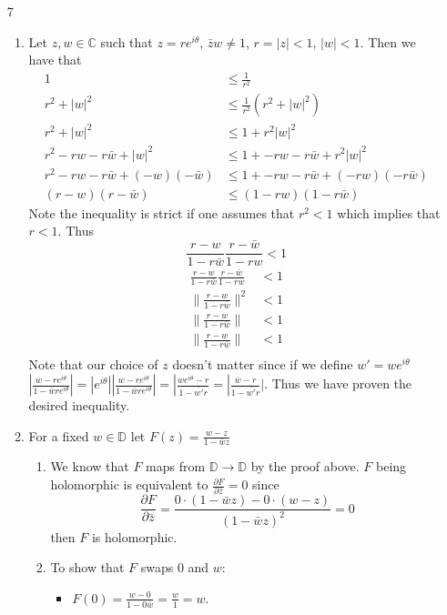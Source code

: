 \documentclass[12pt, letterpaper]{article}
\newcommand{\C}{\mathbb{C}}
\begin{document}
\begin{enumerate}
	\item[7]
	\begin{enumerate}
		\item Let $z,w \in \C$ such that $z = re^{i \theta}$, $\bar{z}w \neq 1$, $r = |z| < 1$, $|w| < 1$.  Then we have that 
		\begin{align*}
			1 &\leq \frac{1}{r^2}\\
			r^2 + |w|^2 &\leq \frac{1}{r^2}(r^2 + |w|^2)\\
			r^2 + |w|^2 &\leq  1 + r^2 |w|^2\\
			r^2 - rw - r\bar{w} +  |w|^2 & \leq 1 +- rw - r\bar{w} +  r^2 |w|^2\\
			r^2 - rw - r\bar{w} + (-w) (-\bar{w}) & \leq 1 +- rw - r \bar{w} +  (-r w)(-r \bar{w})\\
			(r - w)(r- \bar{w}) & \leq (1 - rw)(1 - r \bar{w})						
		\end{align*}
		Note the inequality is strict if one assumes that $r^2 < 1$ which implies that $r < 1$.   Thus 
		$$ \frac{r-w}{1-r\bar{w}} \frac{r- \bar{w}}{1 - r w} < 1 $$
		\begin{align*}
		\frac{r-w}{1-r\bar{w}} \frac{r- \bar{w}}{1 - r w} &< 1 \\
		\|\frac{r-w}{1-r\bar{w}} \|^2 &< 1\\
		\|\frac{r-w}{1-r\bar{w}} \| &< 1\\
		\|\frac{r-w}{1-r\bar{w}} \| &< 1\\
		\end{align*}
		Note that our choice of $z$ doesn't matter since if we define $w' = we^{i \theta}$
		$|\frac{w - re^{i\theta}}{1 - \bar{w}re^{i\theta}}| =|e^{i \theta}|  |\frac{w - re^{i\theta}}{1 - \bar{w}re^{i\theta}}| = |\frac{we^{i\theta} - r}{1 - \bar{w'}r} = |\frac{\bar{w} - r}{1 - \bar{w'}r}|$.  Thus we have proven the desired inequality.
		\item For a fixed $w \in \mathbb{D}$ let $F(z) = \frac{w - z}{1 - \bar{w}z}$ 
		\begin{enumerate}
			\item  We know that $F$ maps from $\mathbb{D} \to \mathbb{D}$ by the proof above.  $F$ being holomorphic is 
			equivalent to $\frac{\partial F}{\partial \bar{z}} = 0$ since  $$\frac{\partial F}{\partial \bar{z}} =  \frac{0 \cdot (1 - \bar{w} z) - 0 \cdot (w-z)}{(1 - \bar{w} z)^2} = 0$$ then $F$ is holomorphic.
			\item To show that $F$ swaps 0 and $w$:
			\begin{itemize}
				\item $F(0) = \frac{w- 0}{1 - 0\bar{w} } = \frac{w}{1} = w$.

\end{itemize}
\end{enumerate}
\end{enumerate}
\end{enumerate}
\end{document}
